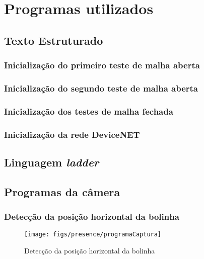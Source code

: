 


\chapter{Programas utilizados}

\section{Texto Estruturado}
\label {stsection}

\subsection{Inicialização do primeiro teste de malha aberta}
\label {stMAinit1}


\subsection{Inicialização do segundo teste de malha aberta}
\label {stMAinit2}


\subsection{Inicialização dos testes de malha fechada}
\label {stMFinit}


\subsection{Inicialização da rede DeviceNET}
\label{}

\section{Linguagem \textit{ladder}}

\section{Programas da câmera}
\subsection{Detecção da posição horizontal da bolinha}
\label{ballhorzpos}
\begin{figure}[!ht]
\centering
\texttt{[image: figs/presence/programaCaptura]}
\caption{Detecção da posição horizontal da bolinha}
\end{figure}